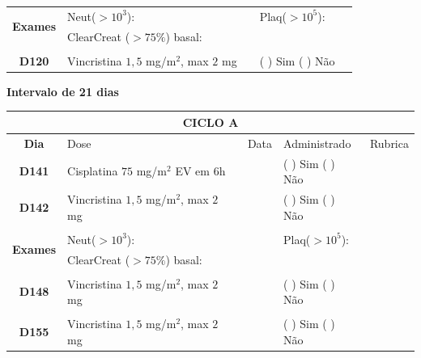\documentclass[11pt,a4paper,oldfontcommands]{memoir}
\begin{document}
\begin{center}
\begin{table}[H]
\begin{tabular}{p{1cm}p{6cm}|p{1cm}|p{3cm}|p{2.5cm}}
    \hline
    \multicolumn{1}{c|}{\multirow{2}{*}{\textbf{Exames}}}&\multicolumn{2}{l|}{Neut(\(>10^3\)):}&{Plaq(\(>10^5\)):}&\\
    \cline{2-5}
    \multicolumn{1}{c|}{\multirow{2}{*}{{}}}&\multicolumn{2}{l|}{ClearCreat (\(>75\%\)) basal:}&{}&{}\\
    \hline
    \\
    \hline
    \multicolumn{1}{c|}{\multirow{1}{*}{\textbf{D120}}}&{Vincristina \(1,5\) mg/m\(^2\), max \(2\) mg}&&{(  ) Sim (  ) Não}&\\
    \hline
\end{tabular}
\end{table}
\textbf{Intervalo de 21 dias}
\begin{table}[H]
\begin{tabular}{p{1cm}p{6cm}|p{1cm}|p{3cm}|p{2.5cm}}
	\hline
	\multicolumn{5}{c}{\textbf{CICLO A}}\\
\hline
    \multicolumn{1}{c|}{\multirow{1}{*}{\textbf{Dia}}}&{Dose}&{Data}&{Administrado}&{Rubrica} \\
    \hline
    \multicolumn{1}{c|}{\multirow{1}{*}{\textbf{D141}}}&{Cisplatina \(75\) mg/m\(^2\) EV em 6h}&&{(  ) Sim (  ) Não}&\\
    \multicolumn{1}{c|}{\multirow{1}{*}{\textbf{D142}}}&{Vincristina \(1,5\) mg/m\(^2\), max \(2\) mg}&&{(  ) Sim (  ) Não}&\\
    \multicolumn{1}{c|}{\multirow{1}{*}{\textbf{}}}&&&&\\
    \hline
    \multicolumn{1}{c|}{\multirow{2}{*}{\textbf{Exames}}}&\multicolumn{2}{l|}{Neut(\(>10^3\)):}&{Plaq(\(>10^5\)):}&\\
    \cline{2-5}
    \multicolumn{1}{c|}{\multirow{2}{*}{{}}}&\multicolumn{2}{l|}{ClearCreat (\(>75\%\)) basal:}&{}&{}\\
    \hline
    \\
    \hline
    \multicolumn{1}{c|}{\multirow{1}{*}{\textbf{D148}}}&{Vincristina \(1,5\) mg/m\(^2\), max \(2\) mg}&&{(  ) Sim (  ) Não}&\\
    \hline
    \\
    \hline
    \multicolumn{1}{c|}{\multirow{1}{*}{\textbf{D155}}}&{Vincristina \(1,5\) mg/m\(^2\), max \(2\) mg}&&{(  ) Sim (  ) Não}&\\
    \hline
    \end{tabular}
    \end{table}


\end{center}
\end{document}
